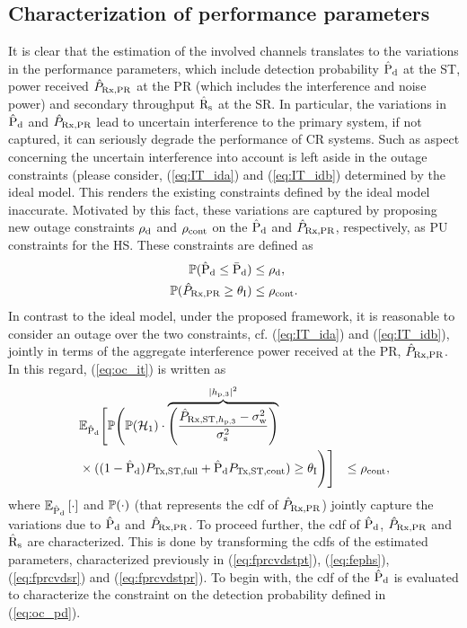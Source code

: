 \subsection{Characterization of performance parameters}
It is clear that the estimation of the involved channels translates to the variations in the performance parameters, which include detection probability $\hat{\text{P}}_{\text{d}}$ at the ST, power received $\hat{P}_{\text{Rx,PR}}$ at the PR (which includes the interference and noise power) and secondary throughput $\hat{\text{{R}}}_{\text{s}}$ at the SR. In particular, the variations in $\hat{\text{P}}_{\text{d}}$ and $\hat{P}_{\text{Rx,PR}}$ lead to uncertain interference to the primary system, if not captured, it can seriously degrade the performance of CR systems. Such as aspect concerning the uncertain interference into account is left aside in the outage constraints (please consider, (\ref{eq:IT_ida}) and (\ref{eq:IT_idb}) determined by the ideal model. This renders the existing constraints defined by the ideal model inaccurate. 
Motivated by this fact, these variations are captured by proposing new outage constraints $\rho_{\text{d}}$ and $\rho_{\text{cont}}$ on the $\hat{\text{P}}_{\text{d}}$ and $\hat{P}_{\text{Rx,PR}}$, respectively, as PU constraints for the HS. These constraints are defined as  
\begin{align}
\mathbb P(\hat{\text{P}}_{\text{d}} \le \bar{\text{P}}_{\text{d}}) &\le \rho_{\text{d}} \label{eq:oc_pd}, \\
\mathbb P(\hat{P}_{\text{Rx,PR}} \ge \theta_{\text{I}}) &\le \rho_{\text{cont}} \label{eq:oc_it}.
\end{align}   
In contrast to the ideal model, under the proposed framework, it is reasonable to consider an outage over the two constraints, cf. (\ref{eq:IT_ida}) and (\ref{eq:IT_idb}), jointly in terms of the aggregate interference power received at the PR, $\hat{P}_{\text{Rx,PR}}$. In this regard, (\ref{eq:oc_it}) is written as 
\begin{align}
& \mathbb{E}_{\hat{\text{P}}_{\text{d}}} \Bigg[ \mathbb P \Bigg( \mathbb P(\mathcal{H}_1) \cdot \smash[b]{\overbrace{\left( \frac{\hat{P}_{\text{Rx,ST,$h_{\text{p,3}}$}} - \sigma^2_{\text{w}}}{\sigma^2_{\text{s}}} \right)}^{|h_{\text{p,3}}|^2}} \nonumber \\ & \times ((1 - \hat{\text{P}}_{\text{d}}) P_{\text{Tx,ST,full}} + \hat{\text{P}}_{\text{d}} P_{\text{Tx,ST,cont}}) \ge \theta_{\text{I}} \Bigg) \Bigg] &\le \rho_{\text{cont}} \label{eq:oc_it_def}, 
\end{align}
where ${\mathbb E}_{\hat{\text{P}}_{\text{d}}}\left[ \cdot \right]$ and $\mathbb P(\cdot)$ (that represents the cdf of $\hat{P}_{\text{Rx,PR}}$) jointly capture the variations due to $\hat{\text{P}}_{\text{d}}$ and $\hat{P}_{\text{Rx,PR}}$. 
To proceed further, the cdf of $\hat{\text{P}}_{\text{d}}$, $\hat{P}_{\text{Rx,PR}}$ and $\hat{\text{{R}}}_{\text{s}}$ are characterized. This is done by transforming the cdfs of the estimated parameters, characterized previously in (\ref{eq:fprcvdstpt}), (\ref{eq:fephs}), (\ref{eq:fprcvdsr}) and (\ref{eq:fprcvdstpr}). To begin with, the cdf of the $\hat{\text{P}}_{\text{d}}$ is evaluated to characterize the constraint on the detection probability defined in (\ref{eq:oc_pd}). 
